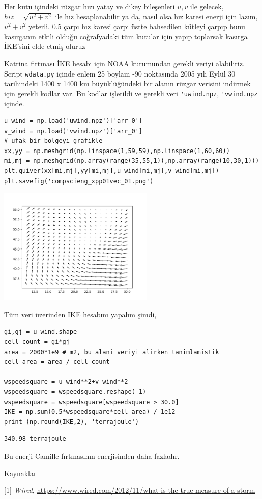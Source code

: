 \documentclass[12pt,fleqn]{article}\usepackage{../../common}
\begin{document}
Her kutu içindeki rüzgar hızı yatay ve dikey bileşenleri $u,v$ ile gelecek, $hız
= \sqrt{u^2+v^2}$ ile hız hesaplanabilir ya da, nasıl olsa hız karesi enerji
için lazım, $u^2+v^2$ yeterli. 0.5 çarpı hız karesi çarpı üstte bahsedilen
kütleyi çarpıp bunu kasırganın etkili olduğu coğrafyadaki tüm kutular için
yapıp toplarsak kasırga İKE'sini elde etmiş oluruz 

Katrina fırtınası İKE hesabı için NOAA kurumundan gerekli veriyi alabiliriz.
Script \verb!wdata.py! içinde enlem 25 boylam -90 noktasında 2005 yılı
Eylül 30 tarihindeki 1400 x 1400 km büyüklüğündeki bir alanın rüzgar verisini
indirmek için gerekli kodlar var. Bu kodlar işletildi ve gerekli veri
\verb!'uwind.npz!, \verb!'vwind.npz! içinde.

\begin{verbatim}
u_wind = np.load('uwind.npz')['arr_0']
v_wind = np.load('vwind.npz')['arr_0']
# ufak bir bolgeyi grafikle
xx,yy = np.meshgrid(np.linspace(1,59,59),np.linspace(1,60,60))
mi,mj = np.meshgrid(np.array(range(35,55,1)),np.array(range(10,30,1)))
plt.quiver(xx[mi,mj],yy[mi,mj],u_wind[mi,mj],v_wind[mi,mj])
plt.savefig('compscieng_xpp01vec_01.png')
\end{verbatim}

\includegraphics[width=20em]{compscieng_xpp01vec_01.png}

Tüm veri üzerinden IKE hesabını yapalım şimdi,

\begin{verbatim}
gi,gj = u_wind.shape
cell_count = gi*gj
area = 2000*1e9 # m2, bu alani veriyi alirken tanimlamistik
cell_area = area / cell_count

wspeedsquare = u_wind**2+v_wind**2
wspeedsquare = wspeedsquare.reshape(-1)
wspeedsquare = wspeedsquare[wspeedsquare > 30.0]
IKE = np.sum(0.5*wspeedsquare*cell_area) / 1e12
print (np.round(IKE,2), 'terrajoule')
\end{verbatim}

\begin{verbatim}
340.98 terrajoule
\end{verbatim}

Bu enerji Camille fırtınasının enerjisinden daha fazladır. 


Kaynaklar

[1] {\em Wired}, \url{https://www.wired.com/2012/11/what-is-the-true-measure-of-a-storm}
\end{document}
